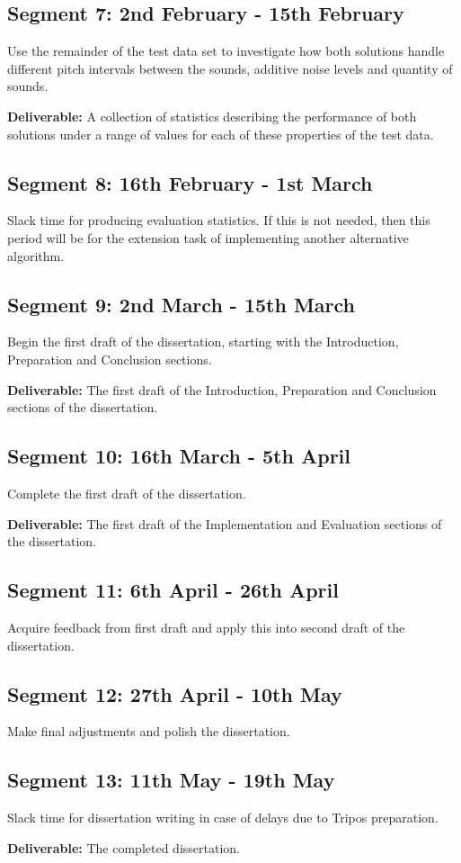 \documentclass[12pt]{article}
\begin{document}
\subsection*{Segment 7: 2nd February - 15th February}

Use the remainder of the test data set to investigate how both solutions handle different pitch intervals between the sounds, additive noise levels and quantity of sounds.

\textbf{Deliverable:} A collection of statistics describing the performance of both solutions under a range of values for each of these properties of the test data.

\subsection*{Segment 8: 16th February - 1st March}

Slack time for producing evaluation statistics. If this is not needed, then this period will be for the extension task of implementing another alternative algorithm.

\subsection*{Segment 9: 2nd March - 15th March}

Begin the first draft of the dissertation, starting with the Introduction, Preparation and Conclusion sections.

\textbf{Deliverable:} The first draft of the Introduction, Preparation and Conclusion sections of the dissertation.

\subsection*{Segment 10: 16th March - 5th April}

Complete the first draft of the dissertation.

\textbf{Deliverable:} The first draft of the Implementation and Evaluation sections of the dissertation.

\subsection*{Segment 11: 6th April - 26th April}

Acquire feedback from first draft and apply this into second draft of the dissertation.

\subsection*{Segment 12: 27th April - 10th May}

Make final adjustments and polish the dissertation.

\subsection*{Segment 13: 11th May - 19th May}

Slack time for dissertation writing in case of delays due to Tripos preparation.

\textbf{Deliverable:} The completed dissertation.
\end{document}
